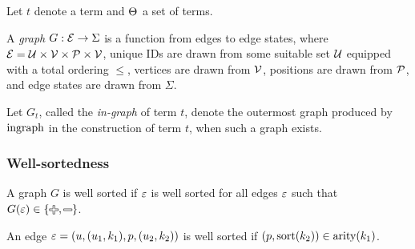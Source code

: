 Let $t$ denote a term and $\Set$ a set of terms.

\begin{definition}
  A \emph{graph} $G : \E \rightarrow \Sigma$ is a function from edges to edge states,
  where $\E = \U \times \V \times \P \times \V$,
  unique IDs are drawn from some suitable set $\U$ equipped with a total ordering $\leq$,
  vertices are drawn from $\V$,
  positions are drawn from $\P$,
  and edge states are drawn from $\Sigma$.
\end{definition}

Let $G_t$, called the \emph{in-graph} of term $t$,
denote the outermost graph produced by $\ingraphOp$ in the construction of term $t$,
when such a graph exists.


\subsubsection{Well-sortedness}

\figureArityContent

\begin{definition}
  A graph $G$ is well sorted if $\e$ is well sorted
  for all edges $\e$ such that $G(\e) \in \{\Plus, \Minus\}$.
\end{definition}

\begin{definition}
  An edge $\e = (u, (u_1, k_1), p, (u_2, k_2))$ is well sorted
  if $(p, \sort(k_2)) \in \arity(k_1)$.
\end{definition}

